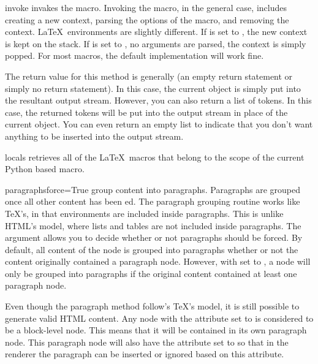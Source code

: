 \begin{methoddesc}[Macro]{invoke}{}
invakes the macro.  Invoking the macro, in the general case, includes 
creating a new context, parsing the options of the macro, and removing 
the context.  \LaTeX\ environments are slightly different.  If 
 is set to , the new context
is kept on the stack.  If  is set to ,
no arguments are parsed, the context is simply popped.  For most macros, the
default implementation will work fine.

The return value for this method is generally  (an empty return
statement or simply no return statement).  In this case, the current object
is simply put into the resultant output stream.  However, you can also
return a list of tokens.  In this case, the returned tokens will be put 
into the output stream in place of the current object.  You can even 
return an empty list to indicate that you don't want anything to be 
inserted into the output stream.
\end{methoddesc}

\begin{methoddesc}[Macro]{locals}{}
retrieves all of the \LaTeX\ macros that belong to the scope of the
current Python based macro.
\end{methoddesc}

\begin{methoddesc}[Macro]{paragraphs}{force=True}
group content into paragraphs.  Paragraphs are grouped once all other
content has been ed.  The paragraph grouping routine works
like \TeX's, in that environments are included inside paragraphs.  This 
is unlike HTML's model, where lists and tables are not included inside 
paragraphs.  The  argument allows you to decide whether or not
paragraphs should be forced.  By default, all content of the node is 
grouped into paragraphs whether or not the content originally contained
a paragraph node.  However, with  set to , a node
will only be grouped into paragraphs if the original content contained
at least one paragraph node.

Even though the paragraph method follow's \TeX's model, it is still possible
to generate valid HTML content.  Any node with the  attribute
set to  is considered to be a block-level node.  This means that 
it will be contained in its own paragraph node.  This paragraph node
will also have the  attribute set to  so that
in the renderer the paragraph can be inserted or ignored based on this
attribute.
\end{methoddesc}

